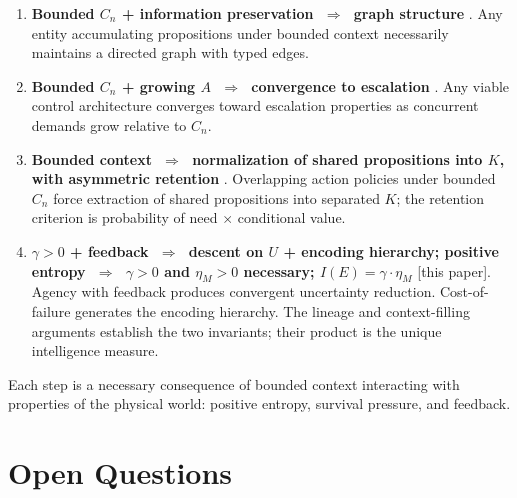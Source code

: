 \documentclass[11pt]{article}
\theoremstyle{definition}
\theoremstyle{remark}
\begin{document}
\begin{enumerate}
\item \textbf{Bounded $C_n$ + information preservation $\;\Rightarrow\;$
      graph structure} \cite{McCarthy2026a}. Any entity accumulating
      propositions under bounded context necessarily maintains a
      directed graph with typed edges.

\item \textbf{Bounded $C_n$ + growing $A$ $\;\Rightarrow\;$ convergence
      to escalation} \cite{McCarthy2026b}. Any viable control
      architecture converges toward escalation properties as concurrent
      demands grow relative to $C_n$.

\item \textbf{Bounded context $\;\Rightarrow\;$ normalization of shared
      propositions into $K$, with asymmetric retention}
      \cite{McCarthy2026c}. Overlapping action policies under bounded
      $C_n$ force extraction of shared propositions into separated $K$;
      the retention criterion is probability of need $\times$ conditional
      value.

\item \textbf{$\gamma > 0$ + feedback $\;\Rightarrow\;$ descent on $U$
      + encoding hierarchy; positive entropy $\;\Rightarrow\;$
      $\gamma > 0$ and $\eta_M > 0$ necessary;
      $I(E) = \gamma \cdot \eta_M$} [this paper]. Agency with feedback
      produces convergent uncertainty reduction. Cost-of-failure
      generates the encoding hierarchy. The lineage and context-filling
      arguments establish the two invariants; their product is the unique
      intelligence measure.
\end{enumerate}

Each step is a necessary consequence of bounded context interacting
with properties of the physical world: positive entropy, survival
pressure, and feedback.

\section{Open Questions}
\label{sec:open}
\end{document}
